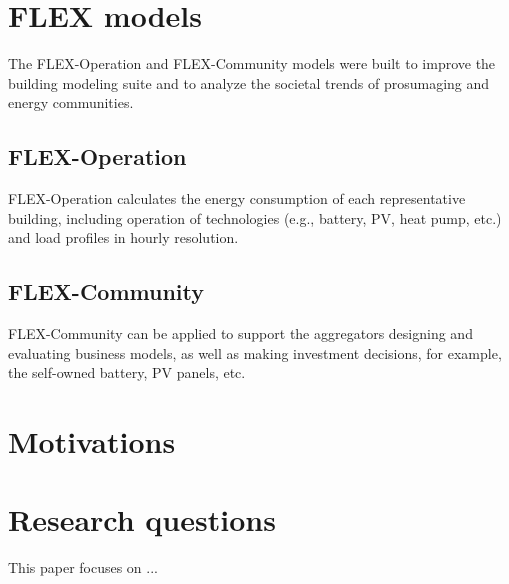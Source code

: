 \section{FLEX models}

The FLEX-Operation and FLEX-Community models were built to improve the building modeling suite and to analyze the societal trends of prosumaging and energy communities.

\subsection{FLEX-Operation}
FLEX-Operation calculates the energy consumption of each representative building, including operation of technologies (e.g., battery, PV, heat pump, etc.) and load profiles in hourly resolution.

\subsection{FLEX-Community}
FLEX-Community can be applied to support the aggregators designing and evaluating business models, as well as making investment decisions, for example, the self-owned battery, PV panels, etc.

\section{Motivations}
\section{Research questions}

This paper focuses on ...

